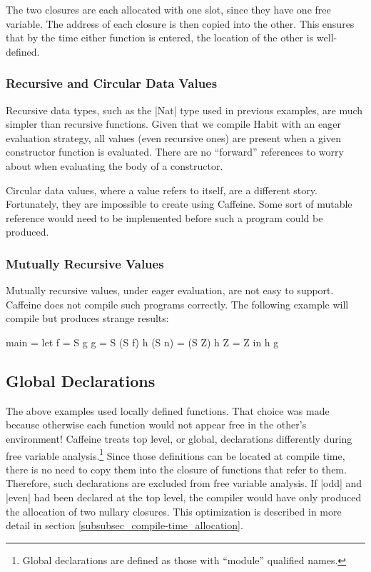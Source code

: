 \documentclass[11pt]{article}
\begin{document}
The two closures are each allocated with one slot, since they have one
free variable. The address of each closure is then copied into the
other. This ensures that by the time either function is entered, the
location of the other is well-defined.

\subsubsection{Recursive and Circular Data Values}

Recursive data types, such as the |Nat| type used in previous
examples, are much simpler than recursive functions. Given that we
compile Habit with an eager evaluation strategy, all values (even
recursive ones) are present when a given constructor function is
evaluated. There are no ``forward'' references to worry about when
evaluating the body of a constructor.  

Circular data values, where a
value refers to itself, are a different story. Fortunately, they are
impossible to create using Caffeine. Some sort of mutable reference
would need to be implemented before such a
program could be produced.

\subsubsection{Mutually Recursive Values}

Mutually recursive values, under eager evaluation, are not easy to
support. Caffeine does not compile such programs correctly. The
following example will compile but produces strange results:

\begin{code}
  main = 
     let  f        = S g
          g        = S (S f) 
          h (S n)  = (S Z)
          h Z      = Z
     in h g
\end{code}

\subsection{Global Declarations}
\label{subsec_global}
The above examples used locally defined functions. That choice was
made because otherwise each function would not appear free
in the other's environment! Caffeine treats top level, or global,
declarations differently during free variable analysis.\footnote{Global
  declarations are defined as those with ``module'' qualified
  names.} Since those definitions can
be  located at compile time, there is no need to copy them into
the closure of functions that refer to them. Therefore, such
declarations are excluded from free variable analysis. If |odd| and
|even| had been declared at the top level, the compiler would have
only produced the allocation of two nullary closures. This
optimization is described in more detail in section
\ref{subsubsec_compile-time_allocation}.
\end{document}
